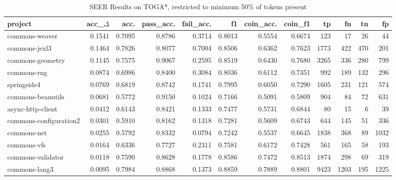 \begin{table*}
\centering
\caption{SEER Results on TOGA*, restricted to minimum 50\% of tokens present}
\label{tab:toga_results_50}
\begin{tabular}{lrrrrrrrrrrr}
\toprule
                project &  acc\_$\Delta$ &    acc. &  pass\_acc. &  fail\_acc. &      f1 &  coin\_acc. &  coin\_f1 &     tp &     fn &    tn &     fp \\
\midrule
         commons-weaver &      0.1541 &  0.7095 &     0.8786 &     0.3714 &  0.8013 &     0.5554 &   0.6674 &    123 &     17 &    26 &     44 \\
          commons-jexl3 &      0.1464 &  0.7826 &     0.8077 &     0.7004 &  0.8506 &     0.6362 &   0.7623 &   1773 &    422 &   470 &    201 \\
       commons-geometry &      0.1145 &  0.7575 &     0.9067 &     0.2595 &  0.8519 &     0.6430 &   0.7680 &   3265 &    336 &   280 &    799 \\
            commons-rng &      0.0874 &  0.6986 &     0.8400 &     0.3084 &  0.8036 &     0.6112 &   0.7351 &    992 &    189 &   132 &    296 \\
            springside4 &      0.0769 &  0.6819 &     0.8742 &     0.1741 &  0.7995 &     0.6050 &   0.7290 &   1605 &    231 &   121 &    574 \\
      commons-beanutils &      0.0681 &  0.5772 &     0.9150 &     0.1024 &  0.7166 &     0.5091 &   0.5809 &    904 &     84 &    72 &    631 \\
      async-http-client &      0.0412 &  0.6143 &     0.8421 &     0.1333 &  0.7477 &     0.5731 &   0.6844 &     80 &     15 &     6 &     39 \\
 commons-configuration2 &      0.0301 &  0.5910 &     0.8162 &     0.1318 &  0.7281 &     0.5609 &   0.6743 &    644 &    145 &    51 &    336 \\
            commons-net &      0.0255 &  0.5792 &     0.8332 &     0.0794 &  0.7242 &     0.5537 &   0.6645 &   1838 &    368 &    89 &   1032 \\
            commons-vfs &      0.0164 &  0.6336 &     0.7727 &     0.2311 &  0.7581 &     0.6172 &   0.7428 &    561 &    165 &    58 &    193 \\
      commons-validator &      0.0118 &  0.7590 &     0.8628 &     0.1778 &  0.8586 &     0.7472 &   0.8513 &   1874 &    298 &    69 &    319 \\
          commons-lang3 &      0.0095 &  0.7984 &     0.8868 &     0.1373 &  0.8859 &     0.7889 &   0.8801 &   9423 &   1203 &   195 &   1225 \\

\end{tabular}
\end{table*}

